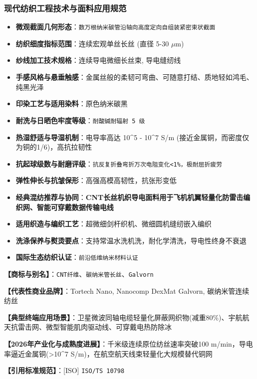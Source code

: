 \documentclass[11pt,openright,twoside,UTF8]{ctexbook}
\begin{document}
\subsubsection*{现代纺织工程技术与面料应用规范}
\begin{itemize} \setlength{\itemsep}{2pt}
    \item \textbf{微观截面几何形态}：\texttt{数万根纳米碳管沿轴向高度定向自组装紧密束状截面}
    \item \textbf{纺织细度指标范围}：连续宏观单丝长丝 (直径 5-30 $\mu$m)
    \item \textbf{纱线加工技术规格}：连续导电微细长丝束, 导电缝纫线
    \item \textbf{手感风格与悬垂触感}：金属丝般的柔韧可弯曲、可随意打结、质地轻如鸿毛、纯黑光泽
    \item \textbf{印染工艺与适用染料}：原色纳米碳黑
    \item \textbf{耐洗与日晒色牢度等级}：\texttt{耐酸碱耐辐射 5 级}
    \item \textbf{热湿舒适与导湿机制}：电导率高达 10\textasciicircum{}5 - 10\textasciicircum{}7 S/m (接近金属铜，而密度仅为铜的1/6)，高抗拉韧性
    \item \textbf{抗起球级数与耐磨评级}：\texttt{抗反复折叠弯折万次电阻变化\textless{}1\%，极耐屈折疲劳}
    \item \textbf{弹性伸长与抗皱保形}：高强高模高韧性，抗张形变低
    \item \textbf{经典混纺推荐与协同}：\textbf{CNT长丝机织导电面料用于飞机机翼轻量化防雷击编织网、智能可穿戴数据传输电线}
    \item \textbf{适用织造与编织工艺}：超微细剑杆织机、微细圆机缝纫嵌入编织
    \item \textbf{洗涤保养与熨烫要点}：支持常温水洗机洗，耐化学清洗，导电性终身不衰退
    \item \textbf{国际生态纺织认证}：\texttt{前沿低维纳米材料认证}
\end{itemize}
\vspace{0.2cm}

\noindent\textbf{【商标与别名】}：\texttt{CNT纤维}、\texttt{碳纳米管长丝}、\texttt{Galvorn}\par
\noindent\textbf{【代表性商业品牌】}：Tortech Nano, Nanocomp DexMat Galvorn, 碳纳米管连续纺丝\par
\noindent\textbf{【典型终端应用场景】}：卫星微波同轴电缆轻量化屏蔽网织物(减重80\%)、宇航航天抗雷击网、微型智能肌肉驱动线、可穿戴电热防除冰\par
\noindent\textbf{【2026年产业化与成熟度进展】}：千米级连续原位纺丝速率突破100 m/min，导电率逼近金属铜(\textgreater{}10\textasciicircum{}7 S/m)，在航空航天线束轻量化大规模替代铜网\par
\noindent\textbf{【引用标准规范】}：[ISO] \texttt{ISO/TS 10798}\par
\vspace{0.5cm}
\end{document}
